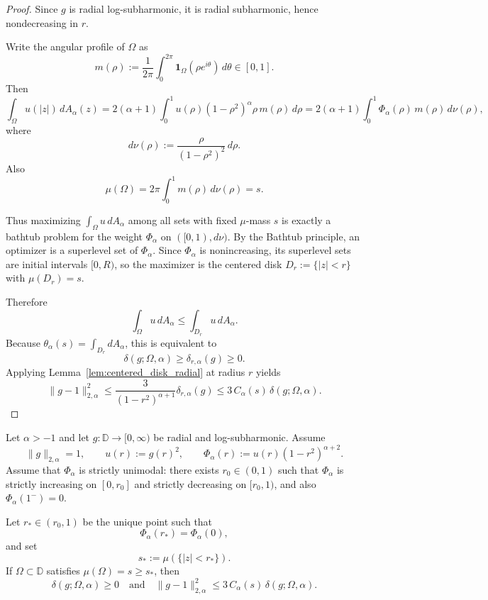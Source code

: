 \documentclass[a4paper,10pt]{amsart}
\newcommand{\D}{\mathbb{D}}
\begin{document}
\begin{proof}
Since $g$ is radial log-subharmonic, it is radial subharmonic, hence nondecreasing in $r$.

Write the angular profile of $\Omega$ as
\[
m(\rho):=\frac1{2\pi}\int_0^{2\pi}\mathbf 1_\Omega(\rho e^{i\theta})\,d\theta\in[0,1].
\]
Then
\[
\int_\Omega u(|z|)\,dA_\alpha(z)
=
2(\alpha+1)\int_0^1 u(\rho)(1-\rho^2)^\alpha \rho\,m(\rho)\,d\rho
=
2(\alpha+1)\int_0^1 \Phi_\alpha(\rho)\,m(\rho)\,d\nu(\rho),
\]
where
\[
d\nu(\rho):=\frac{\rho}{(1-\rho^2)^2}\,d\rho.
\]
Also
\[
\mu(\Omega)=2\pi\int_0^1 m(\rho)\,d\nu(\rho)=s.
\]

Thus maximizing $\int_\Omega u\,dA_\alpha$ among all sets with fixed $\mu$-mass $s$
is exactly a bathtub problem for the weight $\Phi_\alpha$ on $([0,1),d\nu)$.
By the Bathtub principle, an optimizer is a superlevel set of $\Phi_\alpha$.
Since $\Phi_\alpha$ is nonincreasing, its superlevel sets are initial intervals $[0,R)$,
so the maximizer is the centered disk $D_r:=\{|z|<r\}$ with $\mu(D_r)=s$.

Therefore
\[
\int_\Omega u\,dA_\alpha\le \int_{D_r}u\,dA_\alpha.
\]
Because $\theta_\alpha(s)=\int_{D_r}dA_\alpha$, this is equivalent to
\[
\delta(g;\Omega,\alpha)\ge \delta_{r,\alpha}(g)\ge 0.
\]
Applying Lemma~\ref{lem:centered_disk_radial} at radius $r$ yields
\[
\|g-1\|_{2,\alpha}^2
\le \frac{3}{(1-r^2)^{\alpha+1}}\delta_{r,\alpha}(g)
\le 3\,C_\alpha(s)\,\delta(g;\Omega,\alpha).
\]
\end{proof}


\begin{numprop}
\label{thm:disk_regime_unimodal}
Let $\alpha>-1$ and let $g:\D\to[0,\infty)$ be radial and log-subharmonic.
Assume
\[
\|g\|_{2,\alpha}=1,
\qquad
u(r):=g(r)^2,
\qquad
\Phi_\alpha(r):=u(r)(1-r^2)^{\alpha+2}.
\]
Assume that $\Phi_\alpha$ is strictly unimodal: there exists $r_0\in(0,1)$ such that
$\Phi_\alpha$ is strictly increasing on $[0,r_0]$ and strictly decreasing on $[r_0,1)$,
and also $\Phi_\alpha(1^-)=0$.

Let $r_\ast\in(r_0,1)$ be the unique point such that
\[
\Phi_\alpha(r_\ast)=\Phi_\alpha(0),
\]
and set
\[
s_\ast:=\mu(\{|z|<r_\ast\}).
\]
If $\Omega\subset\D$ satisfies $\mu(\Omega)=s\ge s_\ast$, then
\[
\delta(g;\Omega,\alpha)\ge 0
\quad\text{and}\quad
\|g-1\|_{2,\alpha}^2
\le 3\,C_\alpha(s)\,\delta(g;\Omega,\alpha).
\]
\end{numprop}
\end{document}

